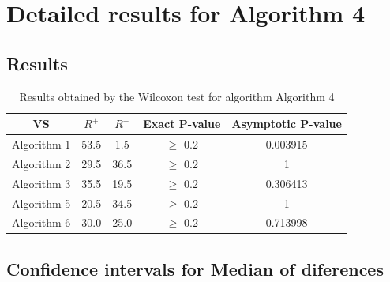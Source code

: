 \documentclass[a4paper,10pt]{article}
\begin{document}
 \clearpage 


\section{Detailed results for Algorithm 4}


\subsection{Results}

\begin{table}[!htp]
\centering\small
\begin{tabular}{
|c|c|c|c|c|}
\hline
 VS & $R^{+}$ & $R^{-}$ & Exact P-value & Asymptotic P-value \\ \hline 
Algorithm 1 & 53.5 & 1.5 & $\geq$ 0.2 & 0.003915\\ \hline 
Algorithm 2 & 29.5 & 36.5 & $\geq$ 0.2 & 1\\ \hline 
Algorithm 3 & 35.5 & 19.5 & $\geq$ 0.2 & 0.306413\\ \hline 
Algorithm 5 & 20.5 & 34.5 & $\geq$ 0.2 & 1\\ \hline 
Algorithm 6 & 30.0 & 25.0 & $\geq$ 0.2 & 0.713998\\ \hline 

\end{tabular}
\caption{Results obtained by the Wilcoxon test for algorithm Algorithm 4}
\end{table}

\subsection{Confidence intervals for Median of diferences}
\end{document}
